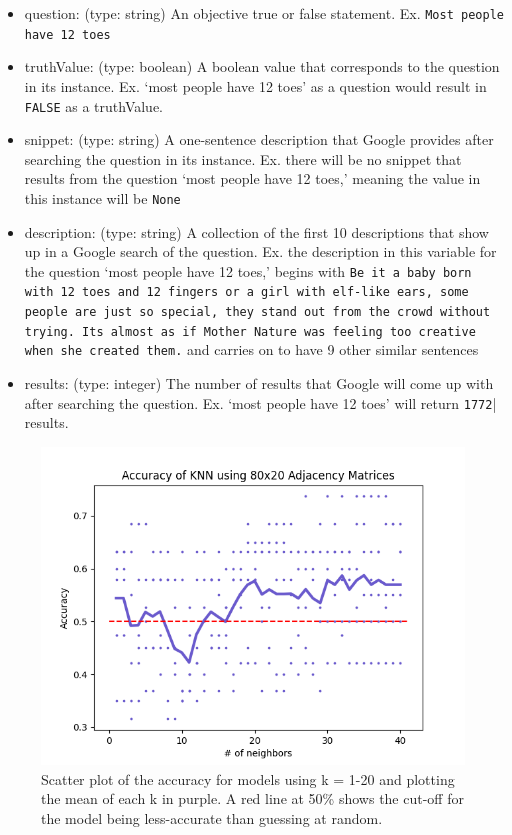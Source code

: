 \documentclass[]{article}
\begin{document}
		\begin{itemize}
			\item question: (type: string) An objective true or false statement. Ex. \texttt{Most people have 12 toes}
				
			\item truthValue: (type: boolean) A boolean value that corresponds to the question in its instance. Ex. `most people have 12 toes' as a question would result in \texttt{FALSE} as a truthValue.
				
			\item snippet: (type: string) A one-sentence description that Google provides after searching the question in its instance. Ex. there will be no snippet that results from the question `most people have 12 toes,' meaning the value in this instance will be \texttt{None}
				
			\item description: (type: string) A collection of the first 10 descriptions that show up in a Google search of the question. Ex. the description in this variable for the question `most people have 12 toes,' begins with \texttt{Be it a baby born with 12 toes and 12 fingers or a girl with elf-like ears, some people are just so special, they stand out from the crowd without trying. Its almost as if Mother Nature was feeling too creative when she created them.} and carries on to have 9 other similar sentences
				
			\item results: (type: integer) The number of results that Google will come up with after searching the question. Ex. `most people have 12 toes' will return \texttt{1772}| results.
		\end{itemize}
		
		\begin{figure}
			\centering
			\includegraphics[width=0.8\linewidth]{accuracies-line.png}
			\caption{Scatter plot of the accuracy for models using k = 1-20 and plotting the mean of each k in purple. A red line at 50\% shows the cut-off for the model being less-accurate than guessing at random.}
			\label{fig:scatter}
		\end{figure}
		
\end{document}
